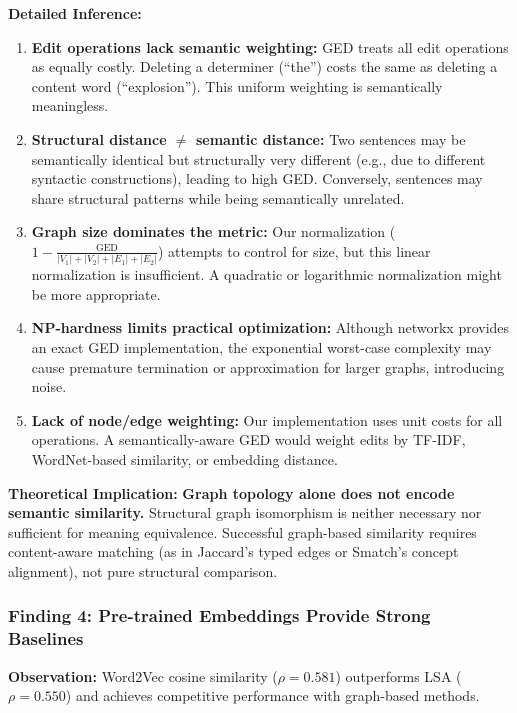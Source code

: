 \documentclass[11pt,a4paper]{article}
\begin{document}
\textbf{Detailed Inference:}
\begin{enumerate}
    \item \textbf{Edit operations lack semantic weighting:} GED treats all edit operations as equally costly. Deleting a determiner (``the'') costs the same as deleting a content word (``explosion''). This uniform weighting is semantically meaningless.
    
    \item \textbf{Structural distance $\neq$ semantic distance:} Two sentences may be semantically identical but structurally very different (e.g., due to different syntactic constructions), leading to high GED. Conversely, sentences may share structural patterns while being semantically unrelated.
    
    \item \textbf{Graph size dominates the metric:} Our normalization ($1 - \frac{\text{GED}}{|V_1| + |V_2| + |E_1| + |E_2|}$) attempts to control for size, but this linear normalization is insufficient. A quadratic or logarithmic normalization might be more appropriate.
    
    \item \textbf{NP-hardness limits practical optimization:} Although networkx provides an exact GED implementation, the exponential worst-case complexity may cause premature termination or approximation for larger graphs, introducing noise.
    
    \item \textbf{Lack of node/edge weighting:} Our implementation uses unit costs for all operations. A semantically-aware GED would weight edits by TF-IDF, WordNet-based similarity, or embedding distance.
\end{enumerate}

\textbf{Theoretical Implication:} \textbf{Graph topology alone does not encode semantic similarity.} Structural graph isomorphism is neither necessary nor sufficient for meaning equivalence. Successful graph-based similarity requires content-aware matching (as in Jaccard's typed edges or Smatch's concept alignment), not pure structural comparison.

\subsubsection{Finding 4: Pre-trained Embeddings Provide Strong Baselines}

\textbf{Observation:} Word2Vec cosine similarity ($\rho = 0.581$) outperforms LSA ($\rho = 0.550$) and achieves competitive performance with graph-based methods.
\end{document}
